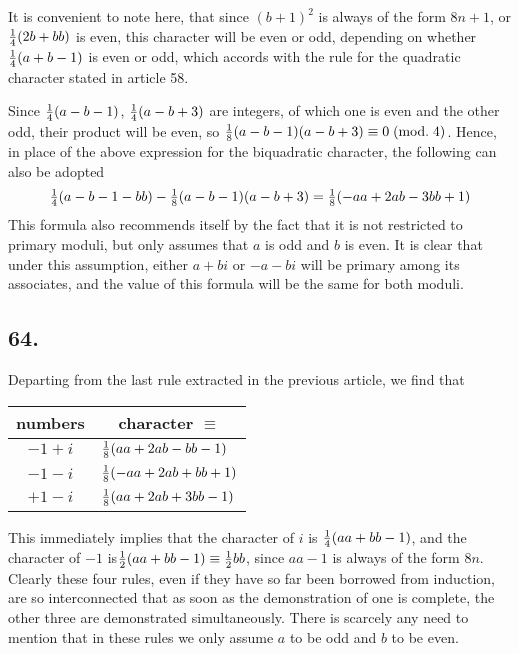 \documentclass[twoside,12pt]{memoir}
\renewcommand{\pmod}[1]{\;(\textrm{mod.}\;#1)}
\let\oldfrac\frac
\def\frac#1#2{\mathchoice{\tfrac{#1}{#2}}{\oldfrac{#1}{#2}}{\genfrac{}{}{}{2}{#1}{#2\mathstrut}}{\genfrac{}{}{}{3}{#1}{#2\mathstrut}}}
\begin{document}
It is convenient to note here, that since \((b+1)^{2}\) is always of the form \(8 n+1\), or \(\frac{1}{4}(2 b+b b)\) is even, this character will be even or odd, depending on whether \(\frac{1}{4}(a+b-1)\) is even or odd, which accords with the rule for the quadratic character stated in article 58.

Since \(\frac{1}{4}(a-b-1)\), \(\frac{1}{4}(a-b+3)\) are integers, of which one is even and the other odd, their product will be even, so \(\frac{1}{8}(a-b-1)(a-b+3) \equiv 0\pmod{4}\). Hence, in place of the above expression for the biquadratic character, the following can also be adopted
\[\frac{1}{4}(a-b-1-b b)-\frac{1}{8}(a-b-1)(a-b+3)=\frac{1}{8}(-a a+2 a b-3 b b+1)\]
This formula also recommends itself by the fact that it is not restricted to primary moduli, but only assumes that \(a\) is odd and \(b\) is even.  It is clear that under this assumption, either \(a+b i\) or \(-a-b i\) will be primary among its associates, and the value of this formula will be the same for both moduli.\\
%

\subsection*{64.}

Departing from the last rule extracted in the previous article, we find that 
\begin{center}
\begin{tabular}{c|l}
numbers & \multicolumn{1}{c}{character \(\equiv\)} \\
\hline
\(-1+i\) & \(\frac{1}{8}(a a+2 a b-b b-1)\) \\
\(-1-i\) & \(\frac{1}{8}(-a a+2 a b+b b+1)\) \\
\(+1-i\) & \(\frac{1}{8}(a a+2 a b+3 b b-1)\) \\
\end{tabular}
\end{center}
This immediately implies that the character of \(i\) is \(\frac{1}{4}(a a+b b-1)\), and the character of \(-1\) is\(\frac{1}{2}(a a+b b-1) \equiv \frac{1}{2} b b\), since \(a a-1\) is always of the form \(8n\). Clearly these four rules, even if they have so far been borrowed from induction, are so interconnected that as soon as the demonstration of one is complete, the other three are demonstrated simultaneously. There is scarcely any need to mention that in these rules we only assume \(a\) to be odd and \(b\) to be even.
%
\end{document}
